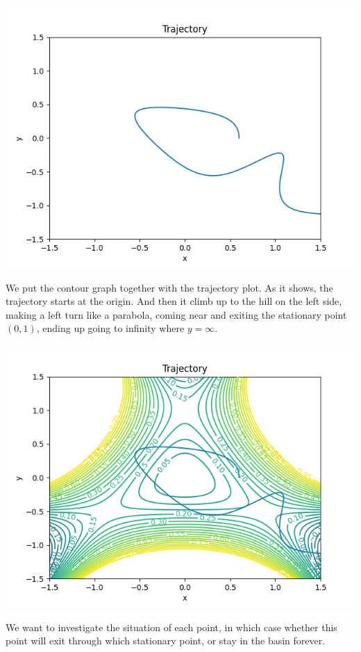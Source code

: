 \documentclass{article}
\begin{document}
	\includegraphics[scale=0.5]{./escape.png}

	We put the contour graph together with the trajectory plot. As it shows, the trajectory starts at the origin. And then it climb up to the hill on the left side,
	making a left turn like a parabola, 
	coming near and exiting the stationary point $(0,1)$, ending up going to infinity where $y = \infty$.

	\includegraphics[scale=0.5]{./escape_trajectory_with_contour.png}

	We want to investigate the situation of each point, in which case whether this point will exit through which stationary point, or stay in 
	the basin forever. 
	
\end{document}
